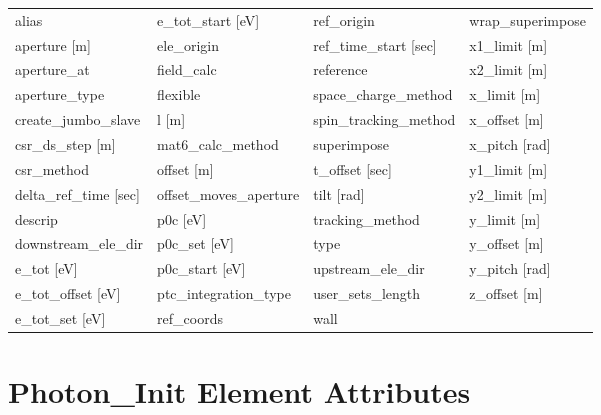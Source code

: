  \begin{tabular}{llll} \toprule
alias                            & e_tot_start [eV]                 & ref_origin                       & wrap_superimpose                 \\
aperture [m]                     & ele_origin                       & ref_time_start [sec]             & x1_limit [m]                     \\
aperture_at                      & field_calc                       & reference                        & x2_limit [m]                     \\
aperture_type                    & flexible                         & space_charge_method              & x_limit [m]                      \\
create_jumbo_slave               & l [m]                            & spin_tracking_method             & x_offset [m]                     \\
csr_ds_step [m]                  & mat6_calc_method                 & superimpose                      & x_pitch [rad]                    \\
csr_method                       & offset [m]                       & t_offset [sec]                   & y1_limit [m]                     \\
delta_ref_time [sec]             & offset_moves_aperture            & tilt [rad]                       & y2_limit [m]                     \\
descrip                          & p0c [eV]                         & tracking_method                  & y_limit [m]                      \\
downstream_ele_dir               & p0c_set [eV]                     & type                             & y_offset [m]                     \\
e_tot [eV]                       & p0c_start [eV]                   & upstream_ele_dir                 & y_pitch [rad]                    \\
e_tot_offset [eV]                & ptc_integration_type             & user_sets_length                 & z_offset [m]                     \\
e_tot_set [eV]                   & ref_coords                       & wall                             &                                  \\
 \bottomrule
 \end{tabular}
 \vfill
 
 \section{Photon_Init Element Attributes}
 \label{s:list.photon.init}
 
